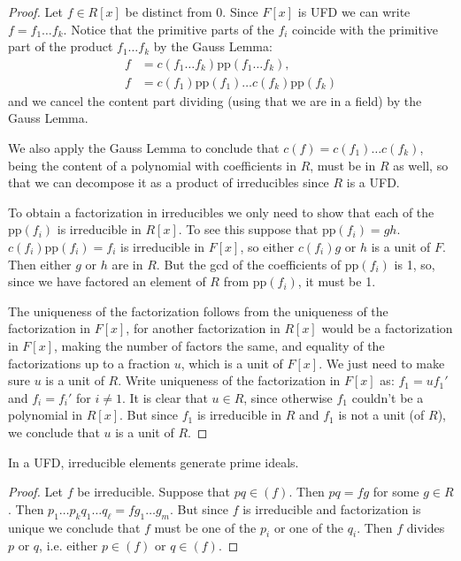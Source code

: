 \begin{proof}
Let $f\in R[x]$ be distinct from 0. Since $F[x]$ is UFD we can write
$f=f_1\ldots f_k$. Notice that the primitive parts of the $f_i$ coincide
with the primitive part of the product $f_1\ldots f_k$ by
the Gauss Lemma: 
\begin{align*}
f&=c(f_1\ldots f_k)\text{pp}(f_1\ldots f_k),\\
f&=c(f_1)\text{pp}(f_1)\ldots c(f_k)\text{pp}(f_k)
\end{align*}
and we cancel the content part dividing (using that we are in a field) by the
Gauss Lemma.

We also apply the Gauss Lemma to conclude that
$c(f)=c(f_1)\ldots c(f_k)$, being the content of a polynomial with coefficients
in $R$, must be in $R$ as well, so that we can decompose it as a product of
irreducibles since $R$ is a UFD.

To obtain a factorization in irreducibles we only need to show that each of the
$\text{pp}(f_i)$ is irreducible in $R[x]$.
To see this suppose that 
$\text{pp}(f_i)=gh$. $c(f_i)\text{pp}(f_i)=f_i$ is irreducible
in $F[x]$, so either $c(f_i)g$ or $h$ is a unit of $F$. Then 
either $g$ or $h$ are in $R$. But the gcd of 
the coefficients of $\text{pp}(f_i)$ is 1, so, since we have factored
an element of $R$ from $\text{pp}(f_i)$, it must be 1.

The uniqueness of the factorization follows from the uniqueness of the
factorization in $F[x]$, for another factorization in $R[x]$ would be a
factorization in $F[x]$, making the number of factors the same,
and equality of the factorizations up
to a fraction $u$,
which is a unit of $F[x]$. We just need to make sure $u$ is a unit of $R$.
Write uniqueness of the factorization in $F[x]$ as: 
$f_1=uf_1'$ and $f_i=f_i'$ for $i\neq 1$.
It is clear that $u \in R$, since otherwise $f_1$ couldn't
be a polynomial in $R[x]$. But since $f_1$ is irreducible in $R$ and $f_1$ 
is not a unit (of $R$), we conclude that $u$ is a unit of $R$.
\end{proof}

\begin{lemma}
\label{lemma-in-UFD-irreducible-elements-generate-prime-ideals}
In a UFD, irreducible elements generate prime ideals.
\end{lemma}

\begin{proof}
Let $f$ be irreducible. Suppose that $pq\in(f)$. Then $pq=fg$ for some  $g\in
R$. Then $p_1\ldots p_kq_1\ldots q_\ell=fg_1\ldots g_m$. But since $f$ is
irreducible and factorization is unique we conclude that $f$ must be one of the
 $p_i$ or one of the $q_i$. Then $f$ divides $p$ or $q$, i.e. either $p\in(f)$
or $q\in(f)$.
\end{proof}

